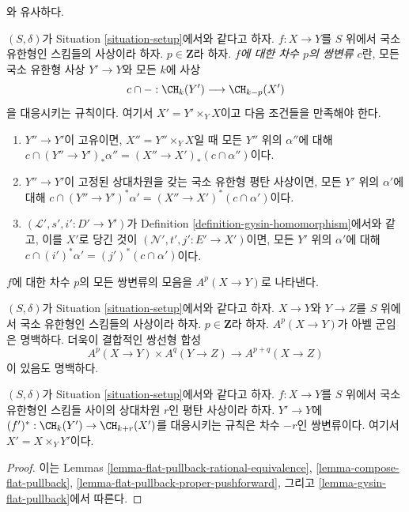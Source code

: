 \begin{definition}
\label{definition-bivariant-class}
\begin{reference}
\cite[Definition 17.1]{F}와 유사하다.
\end{reference}
$(S, \delta)$가 Situation \ref{situation-setup}에서와 같다고 하자.
$f : X \to Y$를 $S$ 위에서 국소 유한형인 스킴들의 사상이라 하자.
$p \in \mathbf{Z}$라 하자.
{\it $f$에 대한 차수 $p$의 쌍변류 $c$}란, 모든 국소 유한형 사상
$Y' \to Y$와 모든 $k$에 사상
$$
c \cap - : \CH_k(Y') \longrightarrow \CH_{k - p}(X')
$$
을 대응시키는 규칙이다. 여기서 $X' = Y' \times_Y X$이고 다음 조건들을
만족해야 한다.
\begin{enumerate}
\item $Y'' \to Y'$이 고유이면, $X'' = Y'' \times_Y X$일 때 모든
$Y''$ 위의 $\alpha''$에 대해
$c \cap (Y'' \to Y')_*\alpha'' = (X'' \to X')_*(c \cap \alpha'')$이다.
\item $Y'' \to Y'$이 고정된 상대차원을 갖는 국소 유한형 평탄
사상이면, 모든 $Y'$ 위의 $\alpha'$에 대해
$c \cap (Y'' \to Y')^*\alpha' = (X'' \to X')^*(c \cap \alpha')$이다.
\item $(\mathcal{L}', s', i' : D' \to Y')$가 Definition
\ref{definition-gysin-homomorphism}에서와 같고, 이를 $X'$로 당긴 것이
$(\mathcal{N}', t', j' : E' \to X')$이면, 모든 $Y'$ 위의 $\alpha'$에
대해 $c \cap (i')^*\alpha' = (j')^*(c \cap \alpha')$이다.
\end{enumerate}
$f$에 대한 차수 $p$의 모든 쌍변류의 모음을 $A^p(X \to Y)$로 나타낸다.
\end{definition}

\noindent
$(S, \delta)$가 Situation \ref{situation-setup}에서와 같다고 하자.
$X \to Y$와 $Y \to Z$를 $S$ 위에서 국소 유한형인 스킴들의 사상이라
하자. $p \in \mathbf{Z}$라 하자. $A^p(X \to Y)$가 아벨 군임은
명백하다. 더욱이 결합적인 쌍선형 합성
$$
A^p(X \to Y) \times A^q(Y \to Z) \to A^{p + q}(X \to Z)
$$
이 있음도 명백하다.

\begin{lemma}
\label{lemma-flat-pullback-bivariant}
$(S, \delta)$가 Situation \ref{situation-setup}에서와 같다고 하자.
$f : X \to Y$를 $S$ 위에서 국소 유한형인 스킴들 사이의 상대차원
$r$인 평탄 사상이라 하자. $Y' \to Y$에
$(f')^* : \CH_k(Y') \to \CH_{k + r}(X')$를 대응시키는 규칙은 차수
$-r$인 쌍변류이다. 여기서 $X' = X \times_Y Y'$이다.
\end{lemma}

\begin{proof}
이는 Lemmas \ref{lemma-flat-pullback-rational-equivalence},
\ref{lemma-compose-flat-pullback},
\ref{lemma-flat-pullback-proper-pushforward}, 그리고
\ref{lemma-gysin-flat-pullback}에서 따른다.
\end{proof}

